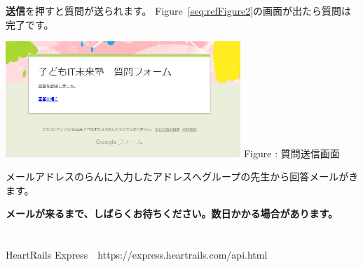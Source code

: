 \documentclass[a4paper,12pt,dvipdfmx]{jarticle}
\newcounter{Figure}
\renewcommand\theFigure{\arabic{Figure}}
\begin{document}
\textbf{送信}を押すと質問が送られます。
Figure~\ref{seq:refFigure2}の画面が出たら質問は完了です。



\begin{center}
\begin{minipage}{8.871cm}
{\upshape
\includegraphics[width=8.871cm]{textbook-img069.png}
 \newline
Figure {\theFigure\label{seq:refFigure2}}: 質問送信画面}
\end{minipage}
\end{center}
メールアドレスのらんに入力したアドレスへグループの先生から回答メールがきます。

{\bfseries
\textmd{メールが来るまで、しばらくお待ちください。数日かかる場合があります。}}

\bigskip
\section{}
HeartRails Express　https://express.heartrails.com/api.html
\end{document}
